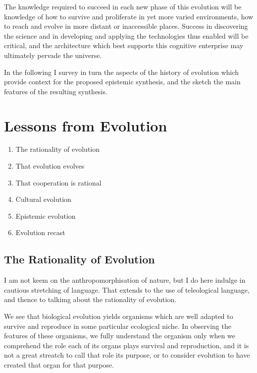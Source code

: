 The knowledge required to succeed in each new phase of this evolution will be knowledge of how to survive and proliferate in yet more varied environments, how to reach and evolve in more distant or inaccessible places.
Success in discovering the science and in developing and applying the technologies thus enabled will be critical, and the architecture which best supports this cognitive enterprise may ultimately pervade the universe.


In the following I survey in turn the aspects of the history of evolution which provide context for the proposed epistemic synthesis, and the sketch the main features of the resulting synthesis.

\section{Lessons from Evolution}

\begin{enumerate}
\item The rationality of evolution
\item That evolution evolves
\item That cooperation is rational
\item Cultural evolution
\item Epistemic evolution
\item Evolution recast
\end{enumerate}

\subsection{The Rationality of Evolution}

I am not keem on the anthropomorphisation of nature, but I do here indulge in cautious stretching of language.
That extends to the use of teleological language, and thence to talkimg about the rationality of evolution.

We see that biological evolution yields organisms which are well adapted to survive and reproduce in some particular ecological niche.
In observing the features of these organisms, we fully understand the organism only when we comprehend the role each of its organs plays survival and reproduction, and it is not a great streatch to call that role its purpose, or to consider evolution to have created that organ for that purpose.

